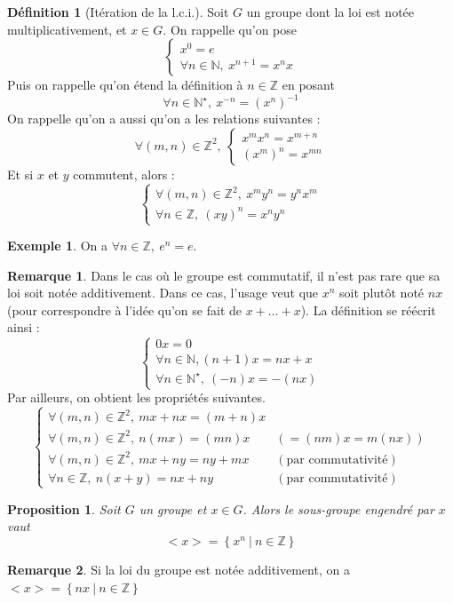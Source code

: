 \documentclass[french]{book}
\newcommand{\N}{\mathbb{N}}
\newcommand{\Z}{\mathbb{Z}}
\newcommand{\st}{^\star}
\newcommand{\inv}{^{-1}}
\theoremstyle{plain}
\newtheorem{prop}{Proposition}[chapter]
\theoremstyle{definition}
\newtheorem{dfn}{Définition}[chapter]
\newtheorem{exa}{Exemple}[chapter]
\newtheorem{rmq}{Remarque}[chapter]
\theoremstyle{remark}
\begin{document}
\begin{dfn}[Itération de la l.c.i.]
	Soit $G$ un groupe dont la loi est notée multiplicativement, et $x\in G$. On rappelle qu'on pose $$\left \{ \begin{array}{ll}
		x^0=e \\ \forall n\in\N,\ x^{n+1}=x^nx
	\end{array}\right.$$ Puis on rappelle qu'on étend la définition à $n\in\Z$ en posant $$\forall n\in\N\st,\ x^{-n}=(x^n)\inv$$ On rappelle qu'on a aussi qu'on a les relations suivantes : $$\forall (m,n)\in\Z^2,\ \left \{ \begin{array}{ll} x^mx^n=x^{m+n} \\ (x^m)^n=x^{mn}\end{array}\right.$$ Et si $x$ et $y$ commutent, alors : $$\left\{\begin{array}{ll}\forall(m,n)\in\Z^2,\ x^my^n=y^nx^m \\ \forall n\in\Z,\ (xy)^n=x^ny^n \end{array}\right.$$
\end{dfn}
\begin{exa}
	On a $\forall n\in\Z,\ e^n=e$.
\end{exa}
\begin{rmq}
	Dans le cas où le groupe est commutatif, il n'est pas rare que sa loi soit notée additivement. Dans ce cas, l'usage veut que $x^n$ soit plutôt noté $nx$ (pour correspondre à l'idée qu'on se fait de $x+\ldots+x$). La définition se réécrit ainsi : $$\left \{ \begin{array}{lll}0x=0 \\ \forall n\in\N, (n+1)x=nx+x\\ \forall n\in\N\st,\ (-n)x=-(nx)\end{array}\right.$$ Par ailleurs, on obtient les propriétés suivantes. $$\left \{\begin{array}{llll}\forall(m,n)\in\Z^2,\ mx+nx=(m+n)x \\ \forall(m,n)\in\Z^2,\ n(mx)=(mn)x & (=(nm)x=m(nx))\\ \forall(m,n)\in\Z^2,\ mx+ny=ny+mx & (\text{par commutativité})\\ \forall n\in\Z,\ n(x+y)=nx+ny & (\text{par commutativité})\end{array}\right.$$
\end{rmq}
\begin{prop}
	Soit $G$ un groupe et $x\in G$. Alors le sous-groupe engendré par $x$ vaut $$<x>=\left\{x^n\ | \ n\in\Z\right\}$$
\end{prop}
\begin{rmq}
	Si la loi du groupe est notée additivement, on a $<x>=\left\{nx\ | \ n\in\Z\right\}$
\end{rmq}
\end{document}

